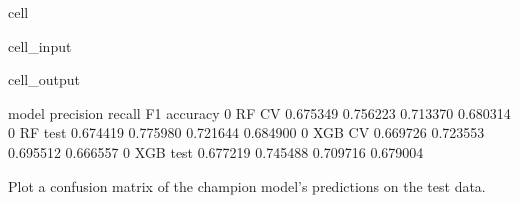 \documentclass[letterpaper,10pt,english]{sphinxmanual}
\begin{document}
\begin{sphinxuseclass}{cell}
\begin{sphinxuseclass}{cell_input}
\begin{sphinxVerbatim}[commandchars=\\\{\}]
    
  \PYG{p}{[} \PYG{p}{]} 
\end{sphinxVerbatim}

\end{sphinxuseclass}
\begin{sphinxuseclass}{cell_output}
\begin{sphinxVerbatim}[commandchars=\\\{\}]
      model  precision    recall        F1  accuracy
0     RF CV   0.675349  0.756223  0.713370  0.680314
0   RF test   0.674419  0.775980  0.721644  0.684900
0    XGB CV   0.669726  0.723553  0.695512  0.666557
0  XGB test   0.677219  0.745488  0.709716  0.679004
\end{sphinxVerbatim}

\end{sphinxuseclass}
\end{sphinxuseclass}
\sphinxAtStartPar
Plot a confusion matrix of the champion model’s predictions on the test data.
\end{document}
